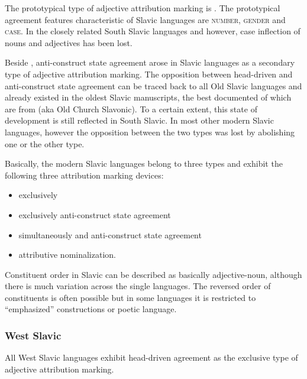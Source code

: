 The prototypical type of adjective attribution marking is . The prototypical agreement features characteristic of Slavic languages are \textsc{number}, \textsc{gender} and \textsc{case}. In the closely related South Slavic languages  and  however, case inflection of nouns and adjectives has been lost.

Beside , anti\hyp{}construct state agreement arose in Slavic languages as a secondary type of adjective attribution marking. The opposition between head\hyp{}driven and anti\hyp{}construct state agreement can be traced back to all Old Slavic languages and already existed in the oldest Slavic manuscripts, the best documented of which are from  (aka Old Church Slavonic). To a certain extent, this state of development is still reflected in South Slavic. In most other modern Slavic languages, however the opposition between the two types was lost by abolishing one or the other type.

Basically, the modern Slavic languages belong to three types and exhibit the following three attribution marking devices:
\begin{itemize}
\item exclusively 
\item exclusively anti\hyp{}construct state agreement
\item simultaneously  and anti\hyp{}construct state agreement
\item attributive nominalization.
\end{itemize}
Constituent order in Slavic can be described as basically adjective-noun, although there is much variation across the single languages. The reversed order of constituents is often possible but in some languages it is restricted to “emphasized” constructions or poetic language. 

\subsubsection{West Slavic}
All West Slavic languages exhibit head\hyp{}driven agreement as the exclusive type of adjective attribution marking.

